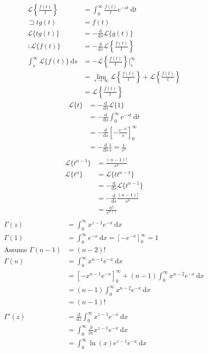 \documentclass[a4paper,11pt]{article}
\theoremstyle{plain}
\theoremstyle{definition}
\newcommand{\cL}{\mathcal{L}}
\newcommand{\dx}{\text{d}}
\newcommand{\del}{\partial}
\newcommand{\lett}{\sqsupset}
\begin{document}
\begin{equation}
\begin{aligned}	
	\mathcal{L}\left\{\frac{f(t)}{t}\right\} 
	&= \int_0^\infty \frac{f(t)}{t}e^{-st}\ \dx t\\
	\lett tg(t) &= f(t)\\
	\mathcal{L}\{tg(t)\}&=-\frac{\dx }{\dx s}\mathcal{L}\{g(t)\}\\
	\therefore \mathcal{L}\{f(t)\}&=-\frac{\dx }{\dx s}
	\mathcal{L}\left\{\frac{f(t)}{t}\right\} \\
	\int_s^\infty \mathcal{L}\{f(t)\}\ \dx s
	&=-\mathcal{L}\left\{\frac{f(t)}{t}\right\} \bigg|^\infty_s\\
	&=\lim_{s\rightarrow\infty}\mathcal{L}\left\{\frac{f(t)}{t}\right\}
	+\mathcal{L}\left\{\frac{f(t)}{t}\right\}\\
	&=\mathcal{L}\left\{\frac{f(t)}{t}\right\}
\end{aligned}	
\end{equation}
\begin{align*}
	\cL\{t\} &= -\frac{\dx}{\dx s}\cL\{1\}\\
			 &= -\frac{\dx}{\dx s}\int_0^\infty e^{-st}\ \dx t\\
			 &= -\frac{\dx}{\dx s}{\left[-\frac{e^{-st}}{s}\right]}_0^\infty\\
			 &= -\frac{\dx}{\dx s}\frac{1}{s}=\frac{1}{s^2}\\
\end{align*}
\begin{align*}
	\cL\{t^{n-1}\} &= \frac{(n-1)!}{s^n}\\
	\cL\{t^n\} &= \cL\{tt^{n-1}\}\\
			   &= -\frac{\dx}{\dx s}\cL\{t^{n-1}\}\\
			   &= -\frac{\dx}{\dx s}\frac{(n-1)!}{s^n}\\
			   &= \frac{n!}{s^{n+1}}\\
\end{align*}
\begin{align*}
	\Gamma(z)&=\int_0^\infty x^{z-1}e^{-x}\ \dx x\\
	\Gamma(1)&=\int_0^\infty e^{-x}\ \dx x={\left[-e^{-x}\right]}_0^\infty=1\\
	\text{Assume }\Gamma(n-1)&=(n-2)!\\
	\Gamma(n)&=\int_0^\infty x^{n-1}e^{-x}\ \dx x\\
			 &={\left[-x^{n-1}e^{-x}\right]}_0^\infty
	+(n-1)\int_0^\infty x^{n-2}e^{-x}\ \dx x\\
	&=(n-1)\int_0^\infty x^{n-2}e^{-x}\ \dx x\\
	&=(n-1)!\\
	\\
	\Gamma'(z)&=\frac{\dx}{\dx z}\int_0^\infty x^{z-1}e^{-x}\ \dx x\\
	          &=\int_0^\infty \frac{\del}{\del z}x^{z-1}e^{-x}\ \dx x\\
			  &=\int_0^\infty \ln(x)e^{z-1}e^{-x}\ \dx x\\
\end{align*}
\end{document}
